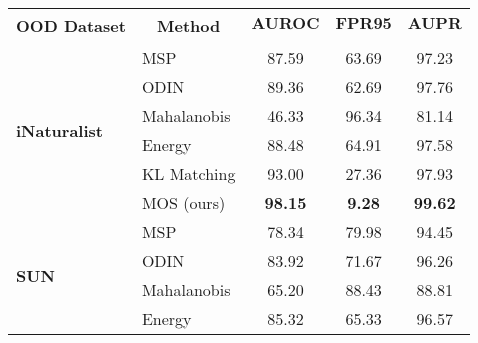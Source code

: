 \documentclass[final]{cvpr}
\begin{document}
\begin{table*}[h]
    \centering
    \footnotesize
\begin{tabular}{l|l|ccc}
\toprule
\multirow{2}{*}{\textbf{OOD Dataset}} & \multicolumn{1}{c|}{\multirow{2}{*}{\textbf{Method}}} & \textbf{AUROC}       & \textbf{FPR95}       & \textbf{AUPR}        \\
                                      & \multicolumn{1}{c|}{}                                 & \multicolumn{1}{c}{} & \multicolumn{1}{c}{} & \multicolumn{1}{c}{} \\ \midrule
\multirow{6}{*}{\textbf{iNaturalist}} & MSP                                                   & 87.59                & 63.69                & 97.23                \\
                                      & ODIN                                                  & 89.36                & 62.69                & 97.76                \\
                                      & Mahalanobis                                           & 46.33                & 96.34                & 81.14                \\
                                      & Energy                                                & 88.48                & 64.91                & 97.58                \\
                                      & KL Matching                                           & 93.00                & 27.36                & 97.93                \\
                                      & MOS (ours)                                            & \textbf{98.15}       & \textbf{9.28}        & \textbf{99.62}       \\ \midrule
\multirow{6}{*}{\textbf{SUN}}         & MSP                                                   & 78.34                & 79.98                & 94.45                \\
                                      & ODIN                                                  & 83.92                & 71.67                & 96.26                \\
                                      & Mahalanobis                                           & 65.20                & 88.43                & 88.81                \\
                                      & Energy                                                & 85.32                & 65.33                & 96.57                \\

\end{tabular}
\end{table*}
\end{document}
